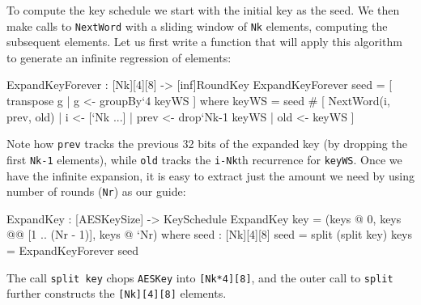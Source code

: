 To compute the key schedule we start with the initial key as the
seed. We then make calls to {\tt NextWord} with a sliding window of
{\tt Nk} elements, computing the subsequent elements. Let us first
write a function that will apply this algorithm to generate an
infinite regression of elements:\indDrop\indTranspose
\begin{code}
  ExpandKeyForever : [Nk][4][8] -> [inf]RoundKey
  ExpandKeyForever seed = [ transpose g | g <- groupBy`{4} keyWS ]
    where keyWS = seed # [ NextWord(i, prev, old)
                          | i    <- [`Nk ...]
                          | prev <- drop`{Nk-1} keyWS
                          | old  <- keyWS
                         ]
\end{code}
Note how {\tt prev} tracks the previous 32 bits of the expanded key
(by dropping the first {\tt Nk-1} elements), while {\tt old} tracks
the {\tt i-Nk}th recurrence for {\tt keyWS}. Once we have the
infinite expansion, it is easy to extract just the amount we need by
using number of rounds ({\tt Nr}) as our guide:\indIndex\indIndexs
\begin{code}
  ExpandKey : [AESKeySize] -> KeySchedule
  ExpandKey key = (keys @ 0, keys @@ [1 .. (Nr - 1)], keys @ `Nr)
    where  seed : [Nk][4][8]
           seed = split (split key)
           keys = ExpandKeyForever seed
\end{code}
The call {\tt split key} chops {\tt AESKey} into {\tt [Nk*4][8]}, and
the outer call to {\tt split} further constructs the {\tt [Nk][4][8]}
elements.

